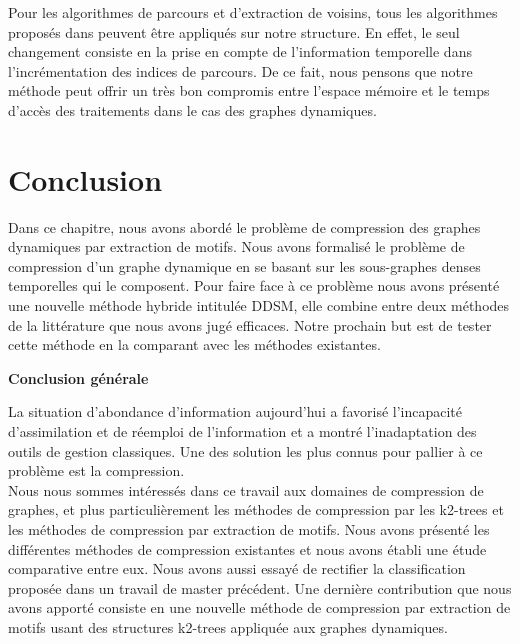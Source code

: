 \documentclass[a4paper,oneside,12pt]{report}
\theoremstyle{definition}
\newtheorem{defn}{Definition}[section]
\begin{document}
			Pour les algorithmes de parcours et d'extraction de voisins, tous les algorithmes proposés dans \citep{hernandez2014compressed} peuvent être appliqués sur notre structure. En effet, le seul changement consiste en la  prise en compte de l'information temporelle dans l'incrémentation des indices de parcours. De ce fait, nous pensons que notre méthode peut offrir un très bon compromis entre l'espace mémoire et le temps d'accès des traitements dans le cas des graphes dynamiques. 
			
		\section{Conclusion}
	Dans ce chapitre, nous avons abordé le problème de compression des graphes dynamiques par extraction de motifs. Nous avons formalisé le problème de compression d'un graphe dynamique en se basant sur les sous-graphes denses temporelles qui le composent. Pour faire face à ce problème nous avons présenté une nouvelle méthode hybride intitulée DDSM, elle combine entre deux méthodes de la littérature que nous avons jugé efficaces. Notre prochain but est de tester cette méthode en la comparant avec les méthodes existantes.   

	
	
	
	



\newpage

	\par
		\vskip 1in
		\Huge 
			\textbf{Conclusion générale} \\[0.5in]
		
		\normalsize
		
	La situation d'abondance d'information aujourd'hui a favorisé l'incapacité d'assimilation et de réemploi de l'information et a montré l'inadaptation des outils de gestion classiques. Une des solution les plus connus pour pallier à ce problème est la compression.\\
		
		Nous nous sommes intéressés dans ce travail aux domaines de compression de graphes, et plus particulièrement les méthodes de compression par les k2-trees et les méthodes de compression par extraction de motifs. Nous avons présenté les différentes méthodes de compression existantes et nous avons établi une étude comparative entre eux. Nous avons aussi essayé de rectifier la classification proposée dans un travail de master précédent. Une dernière contribution que nous avons apporté consiste en une nouvelle méthode de compression par extraction de motifs usant des structures k2-trees appliquée aux graphes dynamiques.\\  
	
\end{document}
